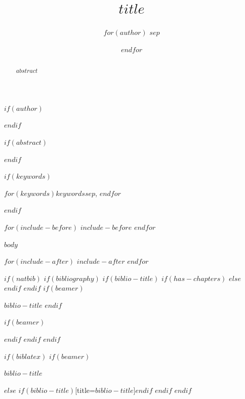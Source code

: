 \documentclass[conference]{IEEEtran}
\begin{document}
\title{$title$}

$if(author)$
\author{
$for(author)$
$sep$\and
$endfor$
}
$endif$

\maketitle

$if(abstract)$
\begin{abstract}
$abstract$
\end{abstract}
$endif$

$if(keywords)$
\begin{IEEEkeywords}
$for(keywords)$$keywords$$sep$, $endfor$
\end{IEEEkeywords}
$endif$

$for(include-before)$
$include-before$
$endfor$

$body$

$for(include-after)$
$include-after$
$endfor$

$if(natbib)$
$if(bibliography)$
$if(biblio-title)$
$if(has-chapters)$
\renewcommand\bibname{$biblio-title$}
$else$
\renewcommand\refname{$biblio-title$}
$endif$
$endif$
$if(beamer)$
\begin{frame}[allowframebreaks]{$biblio-title$}
  \bibliographytrue
$endif$
  
$if(beamer)$
\end{frame}
$endif$
$endif$
$endif$

$if(biblatex)$
$if(beamer)$
\begin{frame}[allowframebreaks]{$biblio-title$}
  \bibliographytrue
  \printbibliography[heading=none]
\end{frame}
$else$
\printbibliography$if(biblio-title)$[title=$biblio-title$]$endif$
$endif$
$endif$
\end{document}
